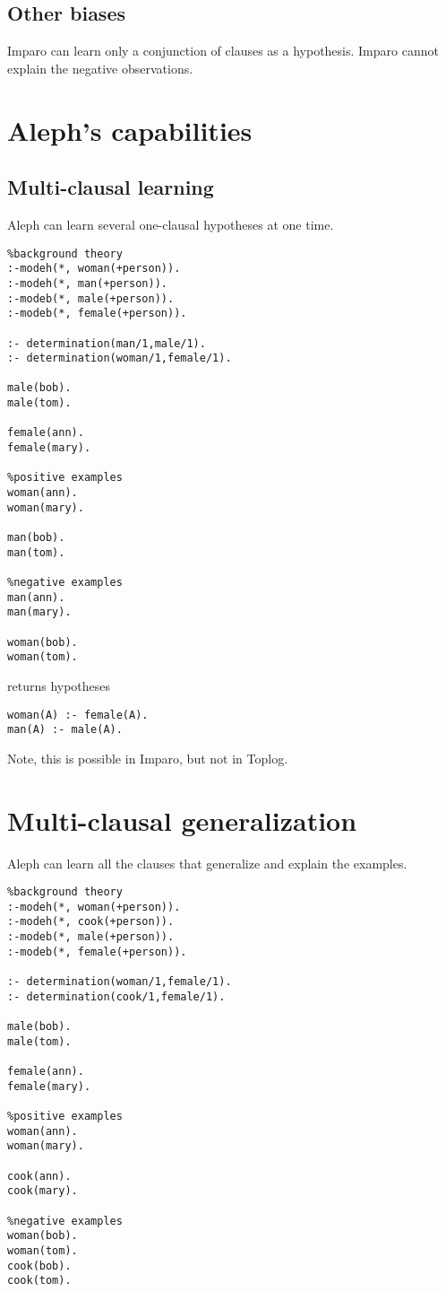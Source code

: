 \subsection{Other biases}
Imparo can learn only a conjunction of clauses as a hypothesis.
Imparo cannot explain the negative observations.

\section{Aleph's capabilities}

\subsection{Multi-clausal learning}
Aleph can learn several one-clausal hypotheses at one time.

\begin{lstlisting}
%background theory
:-modeh(*, woman(+person)).
:-modeh(*, man(+person)).
:-modeb(*, male(+person)).
:-modeb(*, female(+person)).

:- determination(man/1,male/1).
:- determination(woman/1,female/1).

male(bob).
male(tom).

female(ann).
female(mary).

%positive examples
woman(ann).
woman(mary).

man(bob).
man(tom).

%negative examples
man(ann).
man(mary).

woman(bob).
woman(tom).
\end{lstlisting}

returns hypotheses

\begin{lstlisting}
woman(A) :- female(A).
man(A) :- male(A).
\end{lstlisting}

Note, this is possible in Imparo, but not in Toplog.

\section{Multi-clausal generalization}
Aleph can learn all the clauses that generalize and explain the examples.

\begin{lstlisting}
%background theory
:-modeh(*, woman(+person)).
:-modeh(*, cook(+person)).
:-modeb(*, male(+person)).
:-modeb(*, female(+person)).

:- determination(woman/1,female/1).
:- determination(cook/1,female/1).

male(bob).
male(tom).

female(ann).
female(mary).

%positive examples
woman(ann).
woman(mary).

cook(ann).
cook(mary).

%negative examples
woman(bob).
woman(tom).
cook(bob).
cook(tom).
\end{lstlisting}


